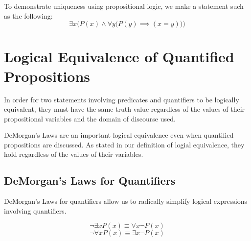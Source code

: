 To demonstrate uniqueness using propositional logic, we make a statement such as the following:
\[ \exists x \Big( P(x) \land \forall y \big( P(y) \implies (x=y)\big)\Big) \]

\section{Logical Equivalence of Quantified Propositions}

In order for two statements involving predicates and quantifiers to be logically equivalent,
they must have the same truth value regardless of the values of their propositional variables
and the domain of discourse used.

DeMorgan's Laws are an important logical equivalence even when quantified propositions are discussed.
As stated in our definition of logial equivalence, they hold regardless of the values of their variables.

%
%

\subsection{DeMorgan's Laws for Quantifiers}

DeMorgan's Laws for quantifiers allow us to radically simplify logical expressions involving quantifiers.

\begin{equation}
  \neg \exists x P(x) \equiv \forall x \neg P(x)
  \label{eq:dmq1}
\end{equation}
\begin{equation}
  \neg \forall x P(x) \equiv \exists x \neg P(x)
  \label{eq:dmq2}
\end{equation}

